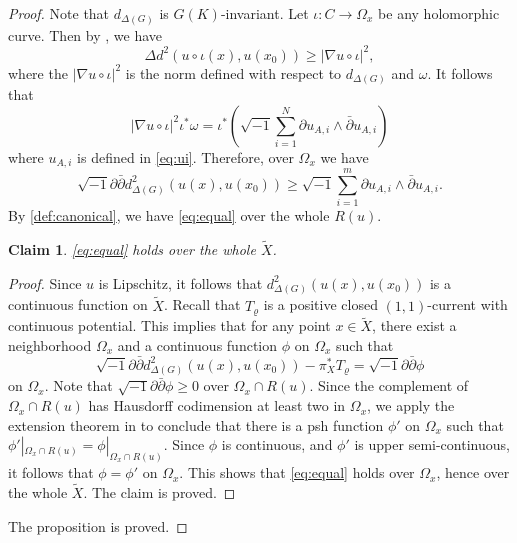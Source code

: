 \documentclass[11pt,a4paper,english]{smfart}
\theoremstyle{plain}
\newtheorem{claim}[theorem]{Claim}
\theoremstyle{definition}
\theoremstyle{plain}
\def\hess{\sqrt{-1}\partial\bar{\partial}}
\def\db{\bar{\partial}}
\def\cC{\mathcal{C}}
\begin{document}
\begin{proof}
Note that $ {d}_{\Delta(G)}$ is   $G(K)$-invariant.  Let $\iota:C\to \Omega_x$ be any holomorphic curve.  Then by \cite[Proposition 2.2 in p. 191]{GS92},  we have
	$$
	\Delta d^2(u\circ \iota (x), u(x_0) )\geq |\nabla u\circ \iota|^2,
	$$
	where the  $|\nabla u\circ \iota|^2$ is the norm defined with respect to  $d_{\Delta(G)}$ and $\omega$.  It follows that 
	$$
	|\nabla u\circ \iota|^2 \iota^*\omega= \iota^*(\sqrt{-1}\sum_{i=1}^{N}\partial u_{A,i}\wedge\db u_{A,i})
	$$
	where $u_{A,i}$ is defined in \eqref{eq:ui}. 
	Therefore, over $\Omega_x$ we have
	$$\hess  {d}_{\Delta(G)}^2(u(x), u(x_0) )\geq \sqrt{-1}\sum_{i=1}^{m}\partial u_{A,i}\wedge\db u_{A,i}.$$
By \cref{def:canonical}, we have  \eqref{eq:equal} over the whole $R(u)$. 
	\begin{claim}
\eqref{eq:equal} holds over the whole $\widetilde{X}$.
	\end{claim}
	\begin{proof}
		 Since $u$ is  Lipschitz, it follows that   $d^2_{\Delta(G)}(u(x),u(x_0))$ is a continuous function on $\widetilde{X}$. Recall that $T_\varrho$ is a positive closed $(1,1)$-current with continuous potential. This implies that for any point $x\in \widetilde{X}$, there exist a neighborhood $\Omega_x$ and a continuous function $\phi$ on $\Omega_x$ such that 
		 $$
\hess d^2_{\Delta(G)}(u(x),u(x_0))- \pi_X^*T_\varrho=\hess \phi 
		 $$
		 on $\Omega_x$. Note that $\hess\phi\geq 0$ over $\Omega_x\cap R(u)$. Since the complement of $\Omega_x\cap R(u)$ has Hausdorff codimension at least two in $\Omega_x$, we apply the extension theorem in \cite[Theorem 3.1(i)]{Shi72} to conclude that there is a  psh function $\phi'$ on $\Omega_x$ such that $\phi'|_{\Omega_x\cap R(u)}=\phi|_{\Omega_x\cap R(u)}$.    Since  $\phi$ is continuous,  and $\phi'$ is upper semi-continuous, it follows that   $\phi=\phi'$ on $\Omega_x$.  This shows that \eqref{eq:equal} holds over $\Omega_x$, hence over the whole $\widetilde{X}$.  The claim is proved. 
	\end{proof}
		The proposition is proved.   
\end{proof}	  
\end{document}
